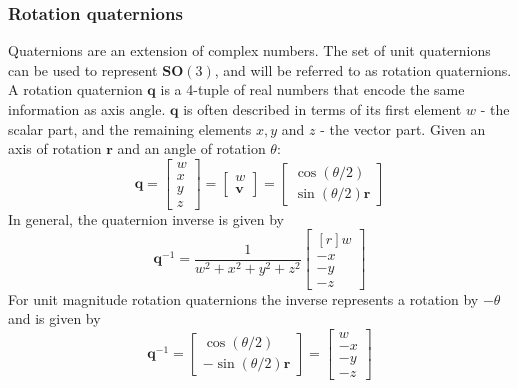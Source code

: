 		\subsubsection{Rotation quaternions}
		Quaternions are an extension of complex numbers. The set of unit quaternions can be used to represent $\mathbf{SO}(3)$, and will be referred to as rotation quaternions. 
		A rotation quaternion $\mathbf{q}$ is a 4-tuple of real numbers that encode the same information as axis angle. $\mathbf{q}$ is often described in terms of its first element $w$ - the scalar part, and the remaining elements $x,y$ and $z$ - the vector part. Given an axis of rotation $\mathbf{r}$ and an angle of rotation $\theta$:
		\begin{equation}
			\mathbf{q} = 
			\begin{bmatrix}
				w \\
				x \\
				y \\
				z
			\end{bmatrix}
			 = 
			 \begin{bmatrix}
 				w \\
 				\mathbf{v}
			 \end{bmatrix}
			 =
			 \begin{bmatrix}
			 	\cos(\theta/2) \\
			 	\sin(\theta/2)\mathbf{r}
			 \end{bmatrix}
		\end{equation}
		In general, the quaternion inverse is given by
		\begin{equation}
			\mathbf{q}^{-1} = 
			\frac{1}{w^2 + x^2 + y^2 + z^2}
		 	\begin{bmatrix*}[r]
				 w \\
				-x \\
				-y \\
				-z
			\end{bmatrix*}
		\end{equation}
		For unit magnitude rotation quaternions the inverse represents a rotation by $-\theta$ and is given by
		\begin{equation}
			\mathbf{q}^{-1} = 
			\begin{bmatrix}
			 	\cos(\theta/2) \\
			 	-\sin(\theta/2)\mathbf{r}
		 	\end{bmatrix} =
		 	\begin{bmatrix}
				w \\
				-x \\
				-y \\
				-z
			\end{bmatrix}
		\end{equation}
		
